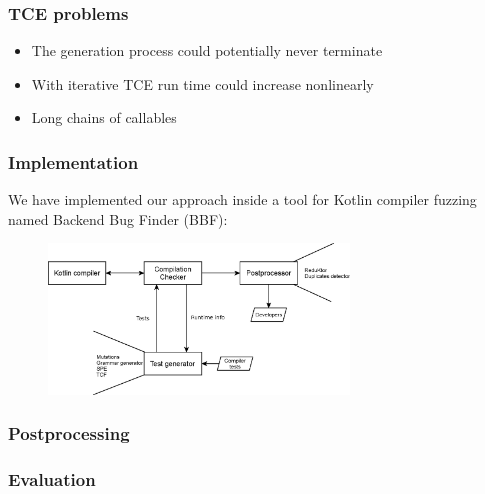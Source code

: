 \begin{frame}
	\frametitle{TCE problems}
	\begin{itemize}
		\item The generation process could potentially never terminate
		\item With iterative TCE run time could increase nonlinearly
		\item Long chains of callables
	\end{itemize}
\end{frame}


\begin{frame}
	\frametitle{Implementation}
We have implemented our approach inside a tool for Kotlin compiler fuzzing named Backend Bug Finder (BBF):
	\begin{figure}
		\includegraphics[width=80mm]{image/bbf_scheme}
	\end{figure}	
\end{frame}


\begin{frame}
	\frametitle{Postprocessing}
\end{frame}


\begin{frame}
	\frametitle{Evaluation}
\end{frame}



